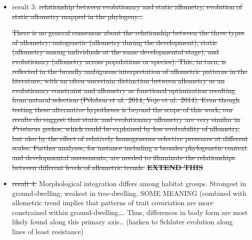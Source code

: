 \documentclass[
  11pt,
]{article}
\providecommand{\tightlist}{%
  \setlength{\itemsep}{0pt}\setlength{\parskip}{0pt}}
\providecommand{\DIFdeltex}[1]{{\protect\color{red}\sout{#1}}}                      %
\providecommand{\DIFdelbegin}{} %
\providecommand{\DIFdelend}{} %
\providecommand{\DIFdel}[1]{\texorpdfstring{\DIFdeltex{#1}}{}} %
\newcommand{\DIFscaledelfig}{0.5}
\newlength{\DIFdelgraphicswidth} %
\newlength{\DIFdelgraphicsheight} %
\newcommand{\DIFdelincludegraphics}[2][]{%
\sbox{\DIFdelgraphicsbox}{\DIFOincludegraphics[#1]{#2}}%
\settoboxwidth{\DIFdelgraphicswidth}{\DIFdelgraphicsbox} %
\settoboxtotalheight{\DIFdelgraphicsheight}{\DIFdelgraphicsbox} %
\scalebox{\DIFscaledelfig}{%
\parbox[b]{\DIFdelgraphicswidth}{\usebox{\DIFdelgraphicsbox}\\[-\baselineskip] \rule{\DIFdelgraphicswidth}{0em}}\llap{\resizebox{\DIFdelgraphicswidth}{\DIFdelgraphicsheight}{%
\setlength{\unitlength}{\DIFdelgraphicswidth}%
\begin{picture}(1,1)%
\thicklines\linethickness{2pt} %
{\color[rgb]{1,0,0}\put(0,0){\framebox(1,1){}}}%
{\color[rgb]{1,0,0}\put(0,0){\line( 1,1){1}}}%
{\color[rgb]{1,0,0}\put(0,1){\line(1,-1){1}}}%
\end{picture}%
}\hspace*{3pt}}} %
} %
\DeclareRobustCommand{\DIFdelbegin}{\DIFOdelbegin \let\includegraphics\DIFdelincludegraphics} %
\DeclareRobustCommand{\DIFdelend}{\DIFOaddend \let\includegraphics\DIFOincludegraphics} %
\begin{document}
\begin{itemize}
\DIFdelend \item
  result 3: \DIFdelbegin \DIFdel{relationship between evolutionary and static allometry,
  evolution of static allometry mapped in the phylogeny\ldots{}
}%

\DIFdel{There is no general consensus about the relationship between the three
types of allometry: ontogenetic (allometry during the development),
static (allometry among individuals at the same developmental stage),
and evolutionary (allometry across populations or species). This, in
turn, is reflected in the broadly ambiguous interpretation of allometric
patterns in the literature, with an often uncertain distinction between
allometry as an evolutionary constraint and allometry as functional
optimization resulting from natural selection (Pélabon et al.~2014, Voje
et al.~2014). Even though testing these alternative hypotheses is beyond
the scope of this work, our results do suggest that static and
evolutionary allometry are very similar in }\emph{\DIFdel{Pristurus}} %
\DIFdel{geckos,
which could be explained by low evolvability of allometry, but also by
the effect of relatively homogeneous selective pressures at different
scales. Further analyses, for instance including a broader phylogenetic
context and developmental assessments, are needed to illuminate the
relationships between different levels of allometric trends.
}\textbf{\DIFdel{EXTEND THIS}}

\item%
\DIFdel{result 4: }\DIFdelend Morphological integration differs among habitat groups.
  Strongest in ground-dwelling; weakest in tree-dwelling. SOME MEANING
  (combined with allometric trend implies that patterns of trait
  covariation are more constrained within ground-dwelling\ldots. Thus,
  differences in body form are most likely found along this primary
  axis\ldots{} (harken to Schluter evolution along lines of least
  resistance)


\end{itemize}
\end{document}
